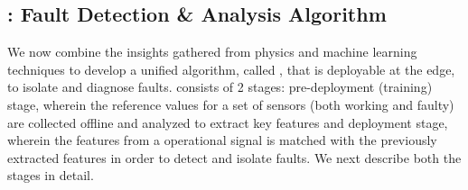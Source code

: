 \subsection{\sol: Fault Detection \& Analysis Algorithm}
\label{subsec:high_level_algorithm}
We now combine the insights gathered from physics and machine learning techniques to develop a unified algorithm, called \sol, that is deployable at the edge, to isolate and diagnose faults.
\sol consists of 2 stages: \ci pre-deployment (training) stage, wherein the reference \aout values for a set of sensors (both working and faulty) are collected offline and analyzed to extract key features and \cii deployment stage, wherein the features from a operational \aout signal is matched with the previously extracted features in order to detect and isolate faults. We next describe both the stages in detail.

